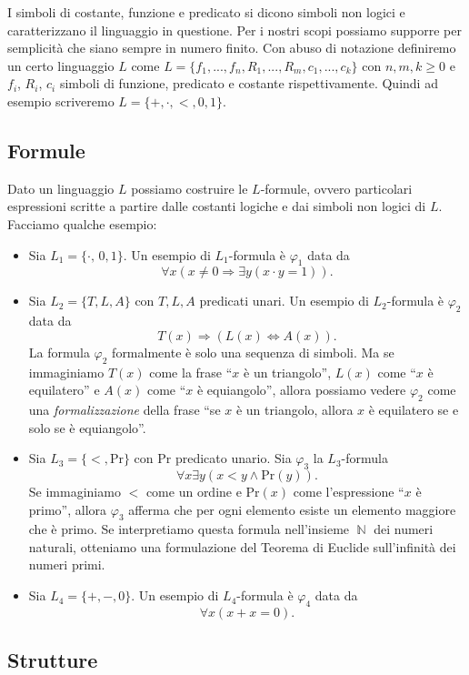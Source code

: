 \documentclass[12pt,a4paper]{report}
\theoremstyle{definition}
\theoremstyle{num.custom-title}
\DeclareMathOperator{\N}{\mathbb{N}}
\DeclareMathOperator{\imp}{\Rightarrow}
\renewcommand{\phi}{\varphi}
\begin{document}
I simboli di costante, funzione e predicato si dicono simboli non logici e caratterizzano il linguaggio in questione. Per i nostri scopi possiamo supporre per semplicità che siano sempre in numero finito. Con abuso di notazione definiremo un certo linguaggio $L$ come $L=\{f_1,...,f_n,R_1,...,R_m, c_1,...,c_k\}$ con $n,m,k \geq 0$ e $f_i$, $R_i$, $c_i$ simboli di funzione, predicato e costante rispettivamente. Quindi ad esempio scriveremo $L=\{+,\cdot,<,0,1\}$.

\subsection{Formule}

Dato un linguaggio $L$ possiamo costruire le $L$-formule, ovvero particolari espressioni scritte a partire dalle costanti logiche e dai simboli non logici di $L$. Facciamo qualche esempio:
\begin{itemize}
\item Sia $L_1=\{\cdot,\,0,1\}$. Un esempio di $L_1$-formula è $\phi_1$ data da
\[
\forall x (x \neq 0 \imp \exists y (x \cdot y = 1)).
\]
\item Sia $L_2=\{T,L,A\}$ con $T,L,A$ predicati unari. Un esempio di $L_2$-formula è $\phi_2$ data da 
\[
T(x) \imp (L(x) \Leftrightarrow A(x)).
\]
La formula $\phi_2$ formalmente è solo una sequenza di simboli. Ma se immaginiamo $T(x)$ come la frase ``$x$ è un triangolo'', $L(x)$ come ``$x$ è equilatero'' e $A(x)$ come ``$x$ è equiangolo'', allora possiamo vedere $\phi_2$ come una \emph{formalizzazione} della frase ``se $x$ è un triangolo, allora $x$ è equilatero se e solo se è equiangolo''.
\item Sia $L_3=\{<,\text{Pr}\}$ con Pr predicato unario. Sia $\phi_3$ la $L_3$-formula
\[
\forall x \exists y (x<y \wedge \text{Pr}(y)).
\]
Se immaginiamo $<$ come un ordine e Pr$(x)$ come l'espressione ``$x$ è primo'', allora $\phi_3$ afferma che per ogni elemento esiste un elemento maggiore che è primo. Se interpretiamo questa formula nell'insieme $\N$ dei numeri naturali, otteniamo una formulazione del Teorema di Euclide sull'infinità dei numeri primi.
\item Sia $L_4=\{+,-,0\}$. Un esempio di $L_4$-formula è $\phi_4$ data da
\[
\forall x (x+x=0).
\]
\end{itemize}

\subsection{Strutture}
\end{document}
